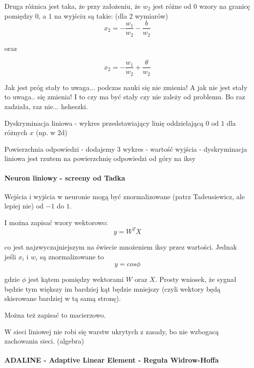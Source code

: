 Druga różnica jest taka, że przy założeniu, że $w_2$ jest różne od $0$ wzory na granicę pomiędzy $0$, a $1$ na wyjściu są takie:
(dla 2 wymiarów)
\begin{equation}
 x_2 = - \frac{w_1}{w_2} - \frac{b}{w_2}
\end{equation}

oraz

\begin{equation}
 x_2 = - \frac{w_1}{w_2} + \frac{\theta}{w_2}
\end{equation}

Jak jest próg stały to uwaga... podczas nauki się nie zmienia! A jak nie jest stały to uwaga.. się zmienia!
I to czy ma być stały czy nie zależy od problemu. Bo raz zadziała, raz nie... heheszki.

Dyskryminacja liniowa - wykres przedstawiający linię oddzielającą $0$ od $1$ dla różnych $x$
(np. w 2d)

Powierzchnia odpowiedzi - dodajemy 3 wykres - wartość wyjścia - dyskryminacja liniowa jest rzutem na powierzchnię odpowiedzi od góry na iksy

\paragraph{Neuron liniowy - screeny od Tadka}

Wejścia i wyjścia w neuronie mogą być znormalizowane (patrz Tadeusiewicz, ale lepiej nie) od $-1$ do $1$.

I można zapisać wzory wektorowo:
\begin{equation}
 y = W^T X
\end{equation}

co jest najzwyczajniejszym na świecie mnożeniem iksy przez wartości. Jednak jeśli $x_i$ i $w_i$ są
znormalizowane to 
\begin{equation}
 y = cos \phi
\end{equation}

gdzie $\phi$ jest kątem pomiędzy wektorami $W$ oraz $X$. Prosty wniosek, że sygnał będzie tym większy
im bardziej kąt będzie mniejszy (czyli wektory będą skierowane bardziej w tą samą stronę).

Można też zapisać to macierzowo.

W sieci liniowej nie robi się warstw ukrytych z zasady, bo nie wzbogacą zachowania sieci.
(algebra)

\paragraph{ADALINE - Adaptive Linear Element - Reguła Widrow-Hoffa}

